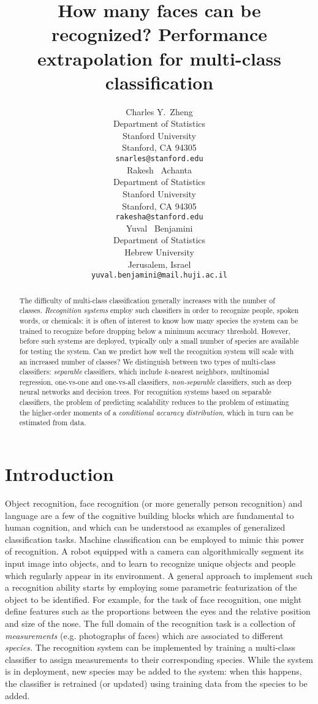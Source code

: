 \documentclass{article}
\title{How many faces can be recognized? Performance extrapolation for
  multi-class classification}
\author{
  Charles Y.~Zheng \\
  Department of Statistics\\
  Stanford University\\
  Stanford, CA 94305 \\
  \texttt{snarles@stanford.edu} \\
  \And
  Rakesh ~Achanta \\
  Department of Statistics\\
  Stanford University\\
  Stanford, CA 94305 \\
  \texttt{rakesha@stanford.edu} \\
  \And
  Yuval ~Benjamini \\
  Department of Statistics \\
  Hebrew University\\
  Jerusalem, Israel\\
  \texttt{yuval.benjamini@mail.huji.ac.il}
}
\begin{document}

\maketitle

\begin{abstract}
The difficulty of multi-class classification generally increases with
the number of classes.  \emph{Recognition systems} employ such classifiers 
in order to recognize people, spoken words, or chemicals:
it is often of interest to know how many species the system can be
trained to recognize before dropping below a minimum accuracy
threshold.  However, before such systems are deployed, typically only
a small number of species are available for testing the system.  Can
we predict how well the recognition system will scale with an
increased number of classes?  We distinguish between two types of
multi-class classifiers: \emph{separable} classifiers, which include $k$-nearest neighbors, multinomial regression,
one-vs-one and one-vs-all classifiers, 
\emph{non-separable} classifiers, such as deep neural networks and decision trees.  For recognition systems based on separable classifiers, the problem of predicting
scalability reduces to the problem of estimating the higher-order
moments of a \emph{conditional accuracy distribution}, which in turn can
be estimated from data.
\end{abstract}

\section{Introduction}

Object recognition, face recognition (or more generally person
recognition) and language are a few of the cognitive building blocks
which are fundamental to human cognition, and which can be understood
as examples of generalized classification tasks. Machine
classification can be employed to mimic this power of recognition.  A
robot equipped with a camera can algorithmically segment its input
image into objects, and to learn to recognize unique objects and
people which regularly appear in its environment.  A general approach
to implement such a recognition ability starts by employing some
parametric featurization of the object to be identified.  For example,
for the task of face recognition, one might define features such as
the proportions between the eyes and the relative position and size of
the nose.  The full domain of the recognition task is a collection of
\emph{measurements} (e.g. photographs of faces) which are associated to different
\emph{species.}  The recognition system can be implemented by training
a multi-class classifier to assign measurements to their corresponding
species.  While the system is in deployment, new species may be added
to the system: when this happens, the classifier is retrained (or
updated) using training data from the species to be added.
\end{document}
